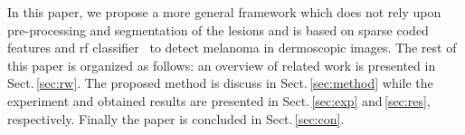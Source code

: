 In this paper, we propose a more general framework which does not rely upon pre-processing and segmentation of the lesions and is based on sparse coded features and \ac{rf} classifier~\cite{breiman2001random} to detect melanoma in dermoscopic images.
The rest of this paper is organized as follows: an overview of related work is presented in Sect.\,\ref{sec:rw}.
The proposed method is discuss in Sect.\,\ref{sec:method} while the experiment and obtained results are presented in Sect.\,\ref{sec:exp} and\,\ref{sec:res}, respectively.
Finally the paper is concluded in Sect.\,\ref{sec:con}.

%
%
